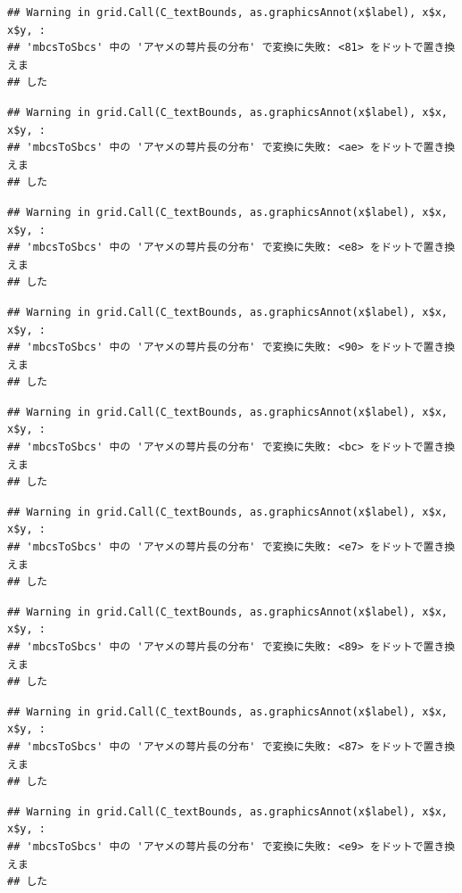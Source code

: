 \documentclass[
]{book}
\begin{document}
\begin{verbatim}
## Warning in grid.Call(C_textBounds, as.graphicsAnnot(x$label), x$x, x$y, :
## 'mbcsToSbcs' 中の 'アヤメの萼片長の分布' で変換に失敗: <81> をドットで置き換えま
## した
\end{verbatim}

\begin{verbatim}
## Warning in grid.Call(C_textBounds, as.graphicsAnnot(x$label), x$x, x$y, :
## 'mbcsToSbcs' 中の 'アヤメの萼片長の分布' で変換に失敗: <ae> をドットで置き換えま
## した
\end{verbatim}

\begin{verbatim}
## Warning in grid.Call(C_textBounds, as.graphicsAnnot(x$label), x$x, x$y, :
## 'mbcsToSbcs' 中の 'アヤメの萼片長の分布' で変換に失敗: <e8> をドットで置き換えま
## した
\end{verbatim}

\begin{verbatim}
## Warning in grid.Call(C_textBounds, as.graphicsAnnot(x$label), x$x, x$y, :
## 'mbcsToSbcs' 中の 'アヤメの萼片長の分布' で変換に失敗: <90> をドットで置き換えま
## した
\end{verbatim}

\begin{verbatim}
## Warning in grid.Call(C_textBounds, as.graphicsAnnot(x$label), x$x, x$y, :
## 'mbcsToSbcs' 中の 'アヤメの萼片長の分布' で変換に失敗: <bc> をドットで置き換えま
## した
\end{verbatim}

\begin{verbatim}
## Warning in grid.Call(C_textBounds, as.graphicsAnnot(x$label), x$x, x$y, :
## 'mbcsToSbcs' 中の 'アヤメの萼片長の分布' で変換に失敗: <e7> をドットで置き換えま
## した
\end{verbatim}

\begin{verbatim}
## Warning in grid.Call(C_textBounds, as.graphicsAnnot(x$label), x$x, x$y, :
## 'mbcsToSbcs' 中の 'アヤメの萼片長の分布' で変換に失敗: <89> をドットで置き換えま
## した
\end{verbatim}

\begin{verbatim}
## Warning in grid.Call(C_textBounds, as.graphicsAnnot(x$label), x$x, x$y, :
## 'mbcsToSbcs' 中の 'アヤメの萼片長の分布' で変換に失敗: <87> をドットで置き換えま
## した
\end{verbatim}

\begin{verbatim}
## Warning in grid.Call(C_textBounds, as.graphicsAnnot(x$label), x$x, x$y, :
## 'mbcsToSbcs' 中の 'アヤメの萼片長の分布' で変換に失敗: <e9> をドットで置き換えま
## した
\end{verbatim}
\end{document}
